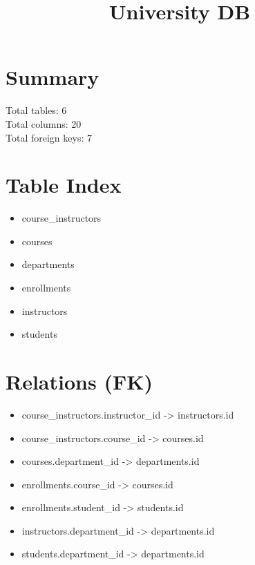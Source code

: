 \documentclass[11pt]{article}
\title{University DB}
\begin{document}
\maketitle
\section*{Summary}
Total tables: 6\\
Total columns: 20\\
Total foreign keys: 7

\section*{Table Index}
\begin{itemize}
  \item course\_instructors
  \item courses
  \item departments
  \item enrollments
  \item instructors
  \item students
\end{itemize}

\section*{Relations (FK)}
\begin{itemize}
  \item course\_instructors.instructor\_id -> instructors.id
  \item course\_instructors.course\_id -> courses.id
  \item courses.department\_id -> departments.id
  \item enrollments.course\_id -> courses.id
  \item enrollments.student\_id -> students.id
  \item instructors.department\_id -> departments.id
  \item students.department\_id -> departments.id
\end{itemize}
\end{document}
